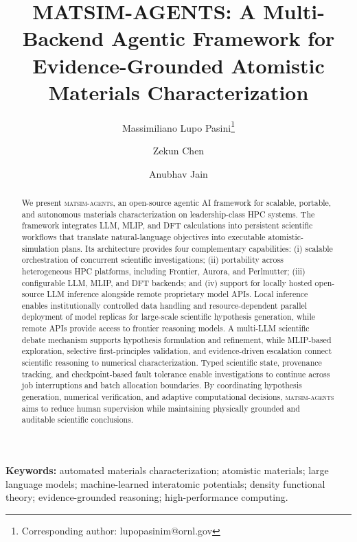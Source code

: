 \documentclass[11pt,a4paper]{article}
\def\ac#1{#1}%
\def\acp#1{#1}%
\begin{document}
\title{MATSIM-AGENTS: A Multi-Backend Agentic Framework for Evidence-Grounded Atomistic Materials Characterization}
\author[1]{Massimiliano Lupo Pasini\thanks{Corresponding author: lupopasinim@ornl.gov}}
\author[2]{Zekun Chen}
\author[2]{Anubhav Jain}
\date{}
\maketitle
\begin{abstract}
We present \textsc{matsim-agents}, an open-source agentic \ac{AI} framework for scalable, portable, and autonomous materials characterization on leadership-class \ac{HPC} systems. The framework integrates \acp{LLM}, \acp{MLIP}, and \ac{DFT} calculations into persistent scientific workflows that translate natural-language objectives into executable atomistic-simulation plans. Its architecture provides four complementary capabilities: (i) scalable orchestration of concurrent scientific investigations; (ii) portability across heterogeneous HPC platforms, including Frontier, Aurora, and Perlmutter; (iii) configurable LLM, MLIP, and DFT backends; and (iv) support for locally hosted open-source LLM inference alongside remote proprietary model APIs. Local inference enables institutionally controlled data handling and resource-dependent parallel deployment of model replicas for large-scale scientific hypothesis generation, while remote APIs provide access to frontier reasoning models. A multi-LLM scientific debate mechanism supports hypothesis formulation and refinement, while MLIP-based exploration, selective first-principles validation, and evidence-driven escalation connect scientific reasoning to numerical characterization. Typed scientific state, provenance tracking, and checkpoint-based fault tolerance enable investigations to continue across job interruptions and batch allocation boundaries. By coordinating hypothesis generation, numerical verification, and adaptive computational decisions, \textsc{matsim-agents} aims to reduce human supervision while maintaining physically grounded and auditable scientific conclusions.
\end{abstract}
\noindent\textbf{Keywords:} automated materials characterization; atomistic materials; large language models; machine-learned interatomic potentials; density functional theory; evidence-grounded reasoning; high-performance computing.
\par\bigskip
\acresetall
\end{document}
